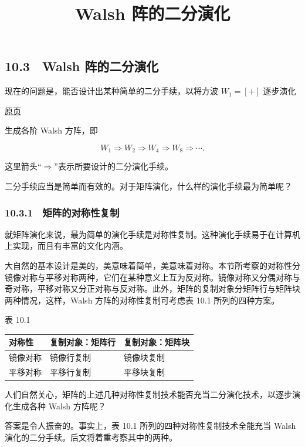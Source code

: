 \documentclass[
  10pt,
  fontset=fandol]{ctexart}
\title{Walsh 阵的二分演化}
\author{}
\date{}
\newcounter{none} %
\begin{document}
\maketitle

\subsection{10.3　Walsh 阵的二分演化}\label{walsh-ux9635ux7684ux4e8cux5206ux6f14ux5316}

现在的问题是，能否设计出某种简单的二分手续，以将方波 \(W_1=[+]\) 逐步演化

\href{../../source-images/pdf-266.jpeg}{原页}

生成各阶 Walsh 方阵，即

\[
W_1\Rightarrow W_2\Rightarrow W_4\Rightarrow W_8\Rightarrow\cdots.
\]

这里箭头``\(\Rightarrow\)''表示所要设计的二分演化手续。

二分手续应当是简单而有效的。对于矩阵演化，什么样的演化手续最为简单呢？

\subsubsection{10.3.1　矩阵的对称性复制}\label{ux77e9ux9635ux7684ux5bf9ux79f0ux6027ux590dux5236}

就矩阵演化来说，最为简单的演化手续是对称性复制。这种演化手续易于在计算机上实现，而且有丰富的文化内涵。

大自然的基本设计是美的，美意味着简单，美意味着对称。本节所考察的对称性分镜像对称与平移对称两种，它们在某种意义上互为反对称。镜像对称又分偶对称与奇对称，平移对称又分正对称与反对称。此外，矩阵的复制对象分矩阵行与矩阵块两种情况，这样，Walsh 方阵的对称性复制可考虑表 10.1 所列的四种方案。

表 10.1

{\def\LTcaptype{none} %
\begin{longtable}[]{@{}lll@{}}
\toprule\noalign{}
对称性 & 复制对象：矩阵行 & 复制对象：矩阵块 \\
\midrule\noalign{}
\endhead
\bottomrule\noalign{}
\endlastfoot
镜像对称 & 镜像行复制 & 镜像块复制 \\
平移对称 & 平移行复制 & 平移块复制 \\
\end{longtable}
}

人们自然关心，矩阵的上述几种对称性复制技术能否充当二分演化技术，以逐步演化生成各种 Walsh 方阵呢？

答案是令人振奋的。事实上，表 10.1 所列的四种对称性复制技术全能充当 Walsh 演化的二分手续。后文将着重考察其中的两种。
\end{document}
